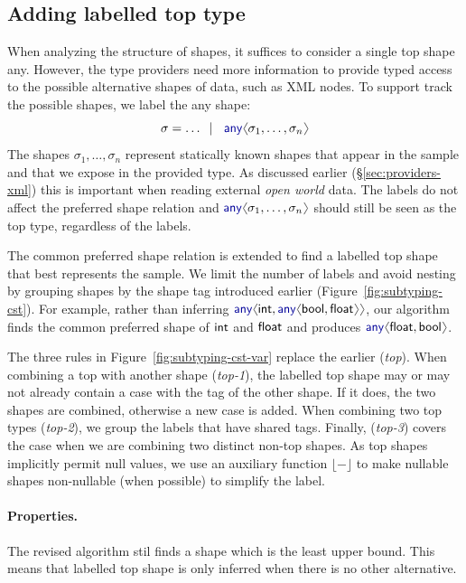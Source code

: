 \documentclass[10pt,preprint,blind,clearpagebib]{sigplanconf}
\newcommand{\langl}{\begin{picture}(4.5,7)
\put(1.1,2.5){\rotatebox{60}{\line(1,0){5.5}}}
\put(1.1,2.5){\rotatebox{300}{\line(1,0){5.5}}}
\end{picture}}
\newcommand{\rangl}{\begin{picture}(4.5,7)
\put(.9,2.5){\rotatebox{120}{\line(1,0){5.5}}}
\put(.9,2.5){\rotatebox{240}{\line(1,0){5.5}}}
\end{picture}}
\newcommand{\kvd}[1]{\textnormal{\textcolor{kvdclr}{\sffamily #1}}}
\newcommand{\ident}[1]{\textnormal{\sffamily #1}}
\newcommand{\lsep}[0]{\;\; | \;\;}
\newcommand{\dropopt}[1]{\lfloor#1\rfloor}
\begin{document}
\subsection{Adding labelled top type}
\label{sec:inference-vars}

When analyzing the structure of shapes, it suffices to consider a single top shape \kvd{any}.
However, the type providers need more information to provide typed access to the possible 
alternative shapes of data, such as XML nodes. To support track the possible shapes, we label 
the \kvd{any} shape:
%
\begin{equation*}
\sigma = \ldots \lsep \kvd{any}\langl \sigma_1, \ldots, \sigma_n\rangl
\end{equation*}
%
The shapes $\sigma_1, \ldots, \sigma_n$ represent statically known shapes that appear in the
sample and that we expose in the provided type. As discussed earlier (\S\ref{sec:providers-xml})
this is important when reading external \emph{open world} data. The labels do not affect the 
preferred shape relation and $\kvd{any}\langl \sigma_1, \ldots, \sigma_n\rangl$ should still be
seen as the top type, regardless of the labels.

The common preferred shape relation is extended to find a labelled top shape that best represents 
the sample. We limit the number of labels and avoid nesting by grouping shapes by the shape tag 
introduced earlier (Figure~\ref{fig:subtyping-cst}).
For example, rather than inferring $\kvd{any}\langl\ident{int}, \kvd{any}\langl\ident{bool}, \ident{float}\rangl\rangl$, 
our algorithm finds the common preferred shape of $\ident{int}$ and $\ident{float}$ and produces 
$\kvd{any}\langl\ident{float},\ident{bool}\rangl$. 

The three rules in Figure~\ref{fig:subtyping-cst-var} replace the earlier (\emph{top}). When 
combining a top with another shape (\emph{top-1}), the labelled top shape may or may not already 
contain a case with the tag of the other shape. If it does, the two shapes are combined, otherwise 
a new case is added. When combining two top types (\emph{top-2}), we group the labels that have 
shared tags. Finally, (\emph{top-3}) covers the case when we are combining two distinct non-top 
shapes. As top shapes implicitly permit \kvd{null} values, we use an auxiliary function $\dropopt{-}$ 
to make nullable shapes non-nullable (when possible) to simplify the label.

\paragraph{Properties.}
The revised algorithm stil finds a shape which is the least upper bound. This means that 
labelled top shape is only inferred when there is no other alternative.
\end{document}
